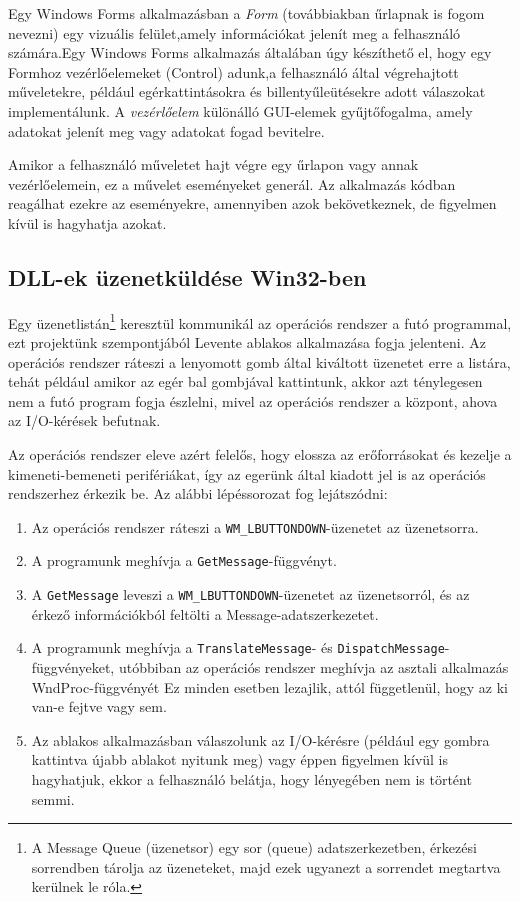 \documentclass[tocnopagenum]{thesis-ekf}
\theoremstyle{definition}
\theoremstyle{remark}
\begin{document}
	Egy Windows Forms alkalmazásban a \textit{Form} (továbbiakban űrlapnak is fogom nevezni) egy vizuális felület,amely információkat jelenít meg a felhasználó számára.Egy Windows Forms alkalmazás általában úgy készíthető el, hogy egy Formhoz vezérlőelemeket (Control) adunk,a felhasználó által végrehajtott műveletekre, például egérkattintásokra és billentyűleütésekre adott válaszokat implementálunk. A \textit{vezérlőelem} különálló GUI-elemek gyűjtőfogalma, amely adatokat jelenít meg vagy adatokat fogad bevitelre.
	
	Amikor a felhasználó műveletet hajt végre egy űrlapon vagy annak vezérlőelemein, ez a művelet eseményeket generál. Az alkalmazás kódban reagálhat ezekre az eseményekre, amennyiben azok bekövetkeznek, de figyelmen kívül is hagyhatja azokat.\cite{winform}
	\subsection{DLL-ek üzenetküldése Win32-ben}
	Egy üzenetlistán\footnote{A Message Queue (üzenetsor) egy sor (queue) adatszerkezetben, érkezési sorrendben tárolja az üzeneteket, majd ezek ugyanezt a sorrendet megtartva kerülnek le róla.} keresztül kommunikál az operációs rendszer a futó programmal, ezt projektünk szempontjából Levente ablakos alkalmazása fogja jelenteni. Az operációs rendszer ráteszi a lenyomott gomb által kiváltott üzenetet erre a listára, tehát például amikor az egér bal gombjával kattintunk, akkor azt ténylegesen nem a futó program fogja észlelni, mivel az operációs rendszer a központ, ahova az I/O-kérések befutnak. 

	Az operációs rendszer eleve azért felelős, hogy elossza az erőforrásokat és kezelje a kimeneti-bemeneti perifériákat, így az egerünk által kiadott jel is az operációs rendszerhez érkezik be.
	Az alábbi lépéssorozat fog lejátszódni:
	\begin{enumerate}
		\item Az operációs rendszer ráteszi a \verb*|WM_LBUTTONDOWN|-üzenetet az üzenetsorra.
		\item A programunk meghívja a \verb*|GetMessage|-függvényt.
		\item A \verb*|GetMessage| leveszi a \verb*|WM_LBUTTONDOWN|-üzenetet az üzenetsorról, és az érkező információkból feltölti a Message-adatszerkezetet.
		\item A programunk meghívja a \verb*|TranslateMessage|- és \verb*|DispatchMessage|-függvényeket, utóbbiban az operációs rendszer meghívja az asztali alkalmazás WndProc-függvényét Ez minden esetben lezajlik, attól függetlenül, hogy az ki van-e fejtve vagy sem.
		\item Az ablakos alkalmazásban válaszolunk az I/O-kérésre (például egy gombra kattintva újabb ablakot nyitunk meg) vagy éppen figyelmen kívül is hagyhatjuk, ekkor a felhasználó belátja, hogy lényegében nem is történt semmi.
	\end{enumerate}
\end{document}
